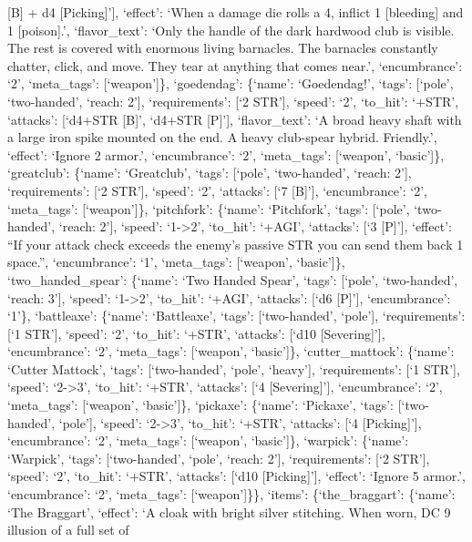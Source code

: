 \documentclass[
  letterpaper,
  DIV=11,
  numbers=noendperiod]{scrartcl}
\begin{document}
{[}B{]} + d4 {[}Picking{]}'{]}, `effect': `When a damage die rolls a 4,
inflict 1 {[}bleeding{]} and 1 {[}poison{]}.', `flavor\_text': `Only the
handle of the dark hardwood club is visible. The rest is covered with
enormous living barnacles. The barnacles constantly chatter, click, and
move. They tear at anything that comes near.', `encumbrance': `2',
`meta\_tags': {[}`weapon'{]}\}, `goedendag': \{`name': `Goedendag!',
`tags': {[}`pole', `two-handed', `reach: 2'{]}, `requirements': {[}`2
STR'{]}, `speed': `2', `to\_hit': `+STR', `attacks': {[}`d4+STR
{[}B{]}', `d4+STR {[}P{]}'{]}, `flavor\_text': `A broad heavy shaft with
a large iron spike mounted on the end. A heavy club-spear hybrid.
Friendly.', `effect': `Ignore 2 armor.', `encumbrance': `2',
`meta\_tags': {[}`weapon', `basic'{]}\}, `greatclub': \{`name':
`Greatclub', `tags': {[}`pole', `two-handed', `reach: 2'{]},
`requirements': {[}`2 STR'{]}, `speed': `2', `attacks': {[}`7
{[}B{]}'{]}, `encumbrance': `2', `meta\_tags': {[}`weapon'{]}\},
`pitchfork': \{`name': `Pitchfork', `tags': {[}`pole', `two-handed',
`reach: 2'{]}, `speed': `1-\textgreater2', `to\_hit': `+AGI', `attacks':
{[}`3 {[}P{]}'{]}, `effect': ``If your attack check exceeds the enemy's
passive STR you can send them back 1 space.'', `encumbrance': `1',
`meta\_tags': {[}`weapon', `basic'{]}\}, `two\_handed\_spear': \{`name':
`Two Handed Spear', `tags': {[}`pole', `two-handed', `reach: 3'{]},
`speed': `1-\textgreater2', `to\_hit': `+AGI', `attacks': {[}`d6
{[}P{]}'{]}, `encumbrance': `1'\}, `battleaxe': \{`name': `Battleaxe',
`tags': {[}`two-handed', `pole'{]}, `requirements': {[}`1 STR'{]},
`speed': `2', `to\_hit': `+STR', `attacks': {[}`d10 {[}Severing{]}'{]},
`encumbrance': `2', `meta\_tags': {[}`weapon', `basic'{]}\},
`cutter\_mattock': \{`name': `Cutter Mattock', `tags': {[}`two-handed',
`pole', `heavy'{]}, `requirements': {[}`1 STR'{]}, `speed':
`2-\textgreater3', `to\_hit': `+STR', `attacks': {[}`4
{[}Severing{]}'{]}, `encumbrance': `2', `meta\_tags': {[}`weapon',
`basic'{]}\}, `pickaxe': \{`name': `Pickaxe', `tags': {[}`two-handed',
`pole'{]}, `speed': `2-\textgreater3', `to\_hit': `+STR', `attacks':
{[}`4 {[}Picking{]}'{]}, `encumbrance': `2', `meta\_tags': {[}`weapon',
`basic'{]}\}, `warpick': \{`name': `Warpick', `tags': {[}`two-handed',
`pole', `reach: 2'{]}, `requirements': {[}`2 STR'{]}, `speed': `2',
`to\_hit': `+STR', `attacks': {[}`d10 {[}Picking{]}'{]}, `effect':
`Ignore 5 armor.', `encumbrance': `2', `meta\_tags': {[}`weapon'{]}\}\},
`items': \{`the\_braggart': \{`name': `The Braggart', `effect': `A cloak
with bright silver stitching. When worn, DC 9 illusion of a full set of
\end{document}
